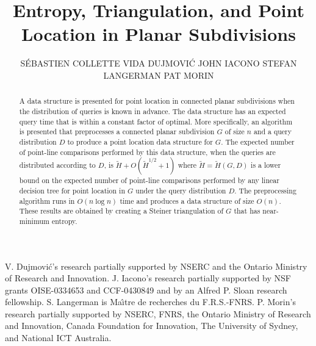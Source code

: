\documentclass[acmtalg]{acmsmall}
\begin{document}

\title{Entropy, Triangulation, and Point Location in Planar Subdivisions}

\author{%
\MakeUppercase{S\'ebastien Collette}
\MakeUppercase{Vida Dujmovi\'c}
\MakeUppercase{John Iacono}
\MakeUppercase{Stefan Langerman}
\MakeUppercase{Pat Morin}
}

\begin{abstract} 
A data structure is presented for point location in connected planar
subdivisions when the distribution of queries is known in advance.
The data structure has an expected query time that is within a
constant factor of optimal.  More specifically, an algorithm is
presented that preprocesses a connected planar subdivision $G$ of size
$n$ and a query distribution $D$ to produce a point location data
structure for $G$. The expected number of point-line comparisons
performed by this data structure, when the queries are distributed
according to $D$, is $\tilde H + O(\tilde H^{1/2}+1)$ where $\tilde
H=\tilde H(G,D)$ is a lower bound on the expected number of point-line
comparisons performed by any linear decision tree for point location
in $G$ under the query distribution $D$.  The preprocessing algorithm
runs in $O(n\log n)$ time and produces a data structure of size
$O(n)$.  These results are obtained by creating a Steiner
triangulation of $G$ that has near-minimum entropy.
\end{abstract}


\begin{bottomstuff}
V. Dujmovi\'c's research partially supported by NSERC and the Ontario
            Ministry of Research and Innovation.
J. Iacono's research partially supported by
            NSF grants OISE-0334653 and CCF-0430849 
            and by an Alfred P. Sloan research fellowship.
S. Langerman is Ma\^{\i}tre de recherches du F.R.S.-FNRS.
P. Morin's research partially supported by NSERC, FNRS, the Ontario
            Ministry of Research and Innovation, Canada Foundation 
            for Innovation, The University of Sydney, and National 
            ICT Australia.
\end{bottomstuff}
\end{document}
